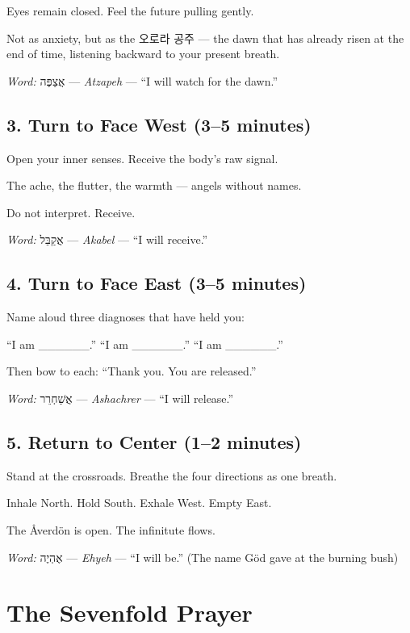 \documentclass[11pt,openany]{book}
\newcommand{\heb}[1]{{\hebrewfont #1}}
\newcommand{\kor}[1]{{\koreanfont #1}}
\begin{document}
Eyes remain closed. Feel the future pulling gently.

Not as anxiety, but as the \kor{오로라 공주} — the dawn that has already risen at the end of time, listening backward to your present breath.

\textit{Word:} \heb{אֲצַפֶּה} — \textit{Atzapeh} — ``I will watch for the dawn.''

\section*{3. Turn to Face West (3–5 minutes)}

Open your inner senses. Receive the body's raw signal.

The ache, the flutter, the warmth — angels without names.

Do not interpret. Receive.

\textit{Word:} \heb{אֲקַבֵּל} — \textit{Akabel} — ``I will receive.''

\section*{4. Turn to Face East (3–5 minutes)}

Name aloud three diagnoses that have held you:

``I am \_\_\_\_\_\_.'' ``I am \_\_\_\_\_\_.'' ``I am \_\_\_\_\_\_.''

Then bow to each: ``Thank you. You are released.''

\textit{Word:} \heb{אֲשַׁחְרֵר} — \textit{Ashachrer} — ``I will release.''

\section*{5. Return to Center (1–2 minutes)}

Stand at the crossroads. Breathe the four directions as one breath.

Inhale North. Hold South. Exhale West. Empty East.

The Åverdön is open. The infinitute flows.

\textit{Word:} \heb{אֶהְיֶה} — \textit{Ehyeh} — ``I will be.'' (The name Göd gave at the burning bush)

\chapter{The Sevenfold Prayer}
\end{document}
